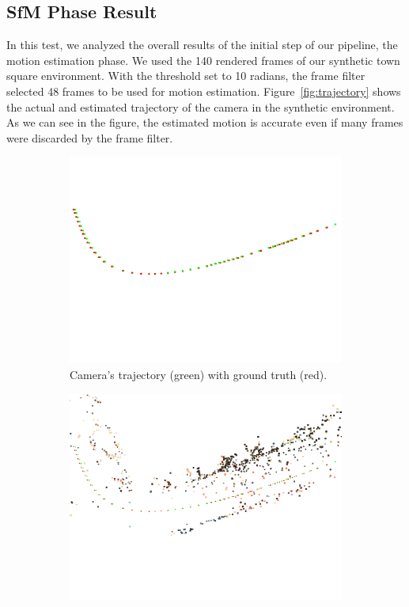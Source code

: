 \subsection{SfM Phase Result}
In this test, we analyzed the overall results of the initial step of our
pipeline, the motion estimation phase. We used the 140 rendered frames of our
synthetic town square environment. With the threshold set to 10 radians,
the frame filter selected 48 frames to be used for motion estimation.
Figure~\ref{fig:trajectory} shows the actual
and estimated trajectory of the camera in the synthetic environment.
As we can see in the figure, the estimated motion is accurate even if many
frames were discarded by the frame filter.
%
\begin{figure}[h]
\centering
\begin{subfigure}{0.45\linewidth}
\includegraphics[width=\linewidth]{img/snapshot00.png}
\caption{Camera's trajectory (green) with ground truth (red).}
\label{fig:trajectory1}
\end{subfigure}
\begin{subfigure}{0.45\linewidth}
\includegraphics[width=\linewidth]{img/snapshot01.png}

\end{subfigure}
\end{figure}
